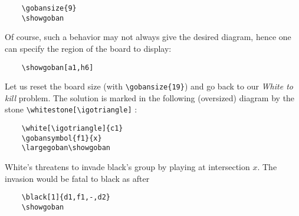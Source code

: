 \documentclass[fleqn]{article}
\begin{document}
\medskip
\begin{minipage}[c][1.0\height][c]{0.45\textwidth}
\begin{verbatim}
	\gobansize{9}
	\showgoban
\end{verbatim}
\end{minipage}
%
\begin{minipage}[c][1.0\height][c]{0.45\textwidth}
\begin{center}
	\showgoban
\end{center}
\end{minipage}

Of course, such a behavior may not always give the desired diagram, hence one can specify the region of the board to display:

\medskip
\begin{minipage}[c][1.0\height][c]{0.45\textwidth}
\begin{verbatim}
	\showgoban[a1,h6]
\end{verbatim}
\end{minipage}
%
\begin{minipage}[c][1.0\height][c]{0.45\textwidth}
\begin{center}
	\showgoban[a1,h6]
\end{center}
\end{minipage}

Let us reset the board size (with \verb|\gobansize{19}|)  and go back to our \textit{White to kill} problem. The solution is marked in the following (oversized) diagram by the stone \verb|\whitestone[\igotriangle]| \whitestone[\igotriangle]:

\medskip
\begin{minipage}[c][1.0\height][c]{0.45\textwidth}
\begin{verbatim}
	\white[\igotriangle]{c1}
	\gobansymbol{f1}{x}
	\largegoban\showgoban
\end{verbatim}
\end{minipage}
%
\begin{minipage}[c][1.0\height][c]{0.45\textwidth}
\begin{center}
	\largegoban
	\showgoban
\end{center}
\end{minipage}

White's \whitestone[\igotriangle] threatens to invade black's group by playing at intersection $x$. The invasion would be fatal to black as after

\medskip
\begin{minipage}[c][1.0\height][c]{0.45\textwidth}
\begin{verbatim}
	\black[1]{d1,f1,-,d2}
	\showgoban
\end{verbatim}
\end{minipage}
%
\begin{minipage}[c][1.0\height][c]{0.45\textwidth}
\begin{center}
	\showgoban
\end{center}
\end{minipage}
\end{document}
